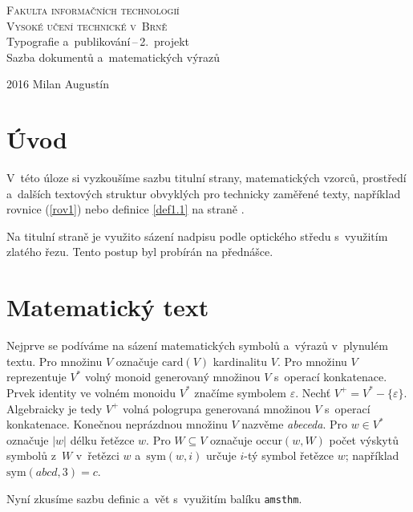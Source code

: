 \documentclass[a4paper, 11pt, twocolumn]{article}
\theoremstyle{definition}
\theoremstyle{plain}
\begin{document}
\begin{titlepage}
\begin{center}
\textsc{{\Huge Fakulta informačních technologií\\Vysoké učení technické v~Brně}}
\\{\LARGE Typografie a~publikování\,--\,2.~projekt\\
Sazba dokumentů a~matematických výrazů}
\end{center}
{\Large 2016 \hfill Milan Augustín}
\end{titlepage}

\setcounter{page}{1}
\section*{Úvod}

V~této úloze si vyzkoušíme sazbu titulní strany, matematických vzorců, prostředí a~dalších textových struktur obvyklých pro technicky zaměřené texty, například rovnice (\ref{rov1}) nebo definice \ref{def1.1} na straně \pageref{def1.1}.

Na titulní straně je využito sázení nadpisu podle optického středu s~využitím zlatého řezu. Tento postup byl probírán na přednášce.

\section{Matematický text}

Nejprve se podíváme na sázení matematických symbolů a~výrazů v~plynulém textu. Pro množinu $V$ označuje $\mbox{card}(V)$ kardinalitu $V$.
Pro množinu $V$ reprezentuje $V^*$ volný monoid generovaný množinou $V$ s~operací konkatenace.
Prvek identity ve volném monoidu $V^*$ značíme symbolem $\varepsilon$.
Nechť $V^+=V^*-\{\varepsilon\}$. Algebraicky je tedy $V^+$ volná pologrupa generovaná množinou $V$ s~operací konkatenace.
Konečnou neprázdnou množinu $V$ nazvěme \emph{abeceda}.
Pro $w \in V^*$  označuje $|w|$ délku řetězce $w$. Pro $W\subseteq V$ označuje $\mbox{occur}(w,W)$ počet výskytů symbolů z~$W$ v~řetězci $w$ a~$\mbox{sym}(w,i)$ určuje $i$-tý symbol řetězce $w$; například $\mbox{sym}(abcd,3)=c$.

Nyní zkusíme sazbu definic a~vět s~využitím balíku \texttt{amsthm}.
\end{document}
